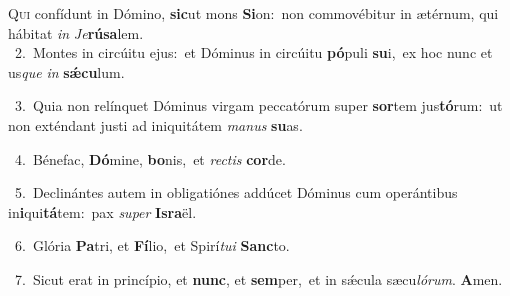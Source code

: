 \lettrine{\initial\textcolor{\initialcolor}{Q}}{ui} confídunt in Dómino, \textbf{sic}\-ut mons \textbf{Si}\-on:~\star non commovébitur in ætérnum, qui hábitat \textit{in} \textit{Je}\-\textbf{rú}\textbf{sa}lem.\\
{\numbfont\textcolor{\numbcolor}{~2.}}~Montes in circúitu ejus:~\dagger et Dóminus in circúitu \textbf{pó}\-puli \textbf{su}\-i,~\star ex hoc nunc et us\textit{que} \textit{in} \textbf{sǽ}\-\textbf{cu}lum.\par
{\numbfont\textcolor{\numbcolor}{~3.}}~Quia non relínquet Dóminus virgam peccatórum super \textbf{sor}\-tem jus\-\textbf{tó}\-rum:~\star ut non exténdant justi ad iniquitátem \textit{ma}\-\textit{nus} \textbf{su}\-as.\par
{\numbfont\textcolor{\numbcolor}{~4.}}~Bénefac, \textbf{Dó}\-mine, \textbf{bo}\-nis,~\star et \textit{rec}\-\textit{tis} \textbf{cor}\-de.\par
{\numbfont\textcolor{\numbcolor}{~5.}}~Declinántes autem in obligatiónes addúcet Dóminus cum operántibus in\-\textbf{i}\-qui\-\textbf{tá}\-tem:~\star pax \textit{su}\-\textit{per} \textbf{Is}\-\textbf{ra}ël.\par
{\numbfont\textcolor{\numbcolor}{~6.}}~Glória \textbf{Pa}\-tri, et \textbf{Fí}\-lio,~\star et Spirí\-\textit{tu}\-\textit{i} \textbf{Sanc}\-to.\par
{\numbfont\textcolor{\numbcolor}{~7.}}~Sicut erat in princípio, et \textbf{nunc}\-, et \textbf{sem}\-per,~\star et in sǽcula sæcu\-\textit{ló}\-\textit{rum}. \textbf{A}\-men.\par

